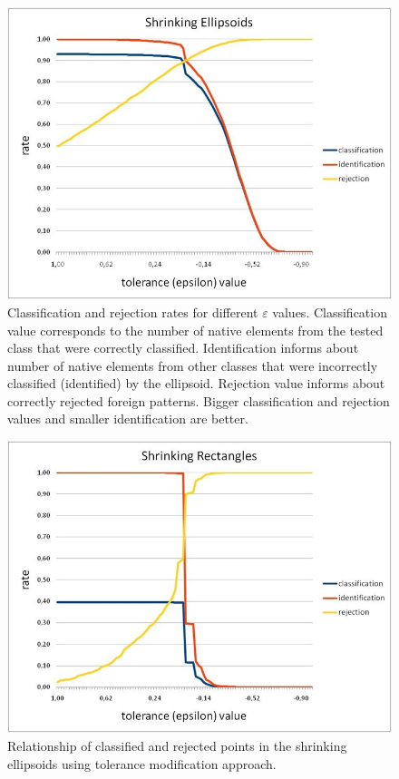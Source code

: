 \begin{figure}[htp]
	\centering
	\includegraphics[width=1.\textwidth]{Figures/shrinking_ellipsoids_tolerance_manipulation.jpg}
	\caption{ Classification and rejection rates for different $\varepsilon$ values. Classification value corresponds to the number of native elements from the tested class that were correctly classified. Identification informs about number of native elements from other classes that were incorrectly classified (identified) by the ellipsoid. Rejection value informs about correctly rejected foreign patterns. Bigger classification and rejection values and smaller identification are better. }
	\label{fig:shrinking_ellipsoids_tolerance_manipulation}\vspace{-3pt}
\end{figure}

\begin{figure}[htp]
\centering
\includegraphics[width=1.\textwidth]{Figures/shrinking_rectangles_tolerance_manipulation.jpg}
\caption{ Relationship of classified and rejected points in the shrinking ellipsoids using tolerance modification approach. }
\label{fig:shrinking_ellipsoids_tolerance_manipulation2}\vspace{-3pt}
\end{figure}

